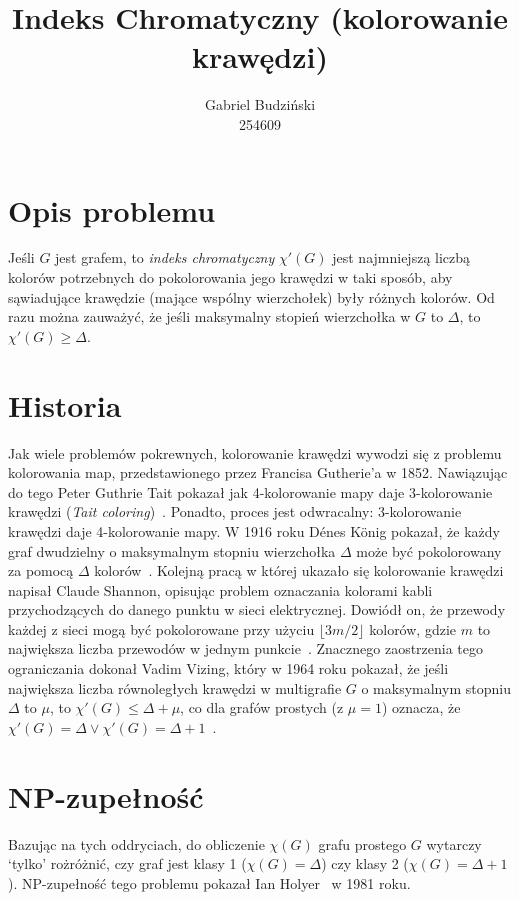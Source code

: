 \documentclass[12pt]{article}
\title{Indeks Chromatyczny (kolorowanie krawędzi)}
\author{Gabriel Budziński\\254609}
\begin{document}
\maketitle

\section{Opis problemu}

Jeśli $G$ jest grafem, to \textit{indeks chromatyczny} $\chi'(G)$ jest najmniejszą liczbą kolorów potrzebnych do pokolorowania jego krawędzi w taki sposób, aby sąwiadujące krawędzie (mające wspólny wierzchołek) były różnych kolorów. Od razu można zauważyć, że jeśli maksymalny stopień wierzchołka w $G$ to $\Delta$, to $\chi'(G) \geq \Delta$.

\section{Historia}

Jak wiele problemów pokrewnych, kolorowanie krawędzi wywodzi się z problemu kolorowania map, przedstawionego przez Francisa Gutherie'a w 1852. Nawiązując do tego Peter Guthrie Tait pokazał jak 4-kolorowanie mapy daje 3-kolorowanie krawędzi (\textit{Tait coloring})~\cite{tait_1880}. Ponadto, proces jest odwracalny: 3-kolorowanie krawędzi daje 4-kolorowanie mapy. W 1916 roku Dénes König pokazał, że każdy graf dwudzielny o maksymalnym stopniu wierzchołka $\Delta$ może być pokolorowany za pomocą $\Delta$ kolorów~\cite{König1916}. Kolejną pracą w której ukazało się kolorowanie krawędzi napisał Claude Shannon, opisując problem oznaczania kolorami kabli przychodzących do danego punktu w sieci elektrycznej. Dowiódł on, że przewody każdej z sieci mogą być pokolorowane przy użyciu $\lfloor 3m/2 \rfloor$ kolorów, gdzie $m$ to największa liczba przewodów w jednym punkcie~\cite{Shannon1949ATO}. Znacznego zaostrzenia tego ograniczania dokonał Vadim Vizing, który w 1964 roku pokazał, że jeśli największa liczba równoległych krawędzi w multigrafie $G$ o maksymalnym stopniu $\Delta$ to $\mu$, to $\chi'(G) \leq \Delta + \mu$, co dla grafów prostych (z $\mu = 1$) oznacza, że $\chi'(G) = \Delta \lor \chi'(G) = \Delta + 1$~\cite{1571980075458819456}.

\section{NP-zupełność}

Bazując na tych oddryciach, do obliczenie $\chi(G)$ grafu prostego $G$ wytarczy `tylko' rożróżnić, czy graf jest klasy 1 ($\chi(G) = \Delta$) czy klasy 2 ($\chi(G) = \Delta + 1$). NP-zupełność tego problemu pokazał Ian Holyer~\cite{Holyer1981TheNO} w 1981 roku.
\end{document}
